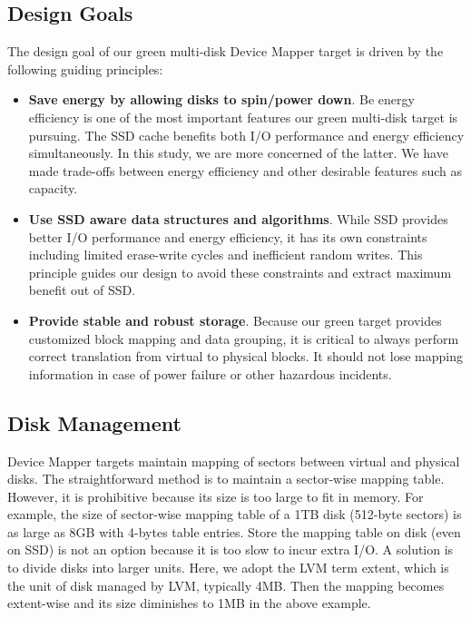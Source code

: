 \subsection{Design Goals}
The design goal of our green multi-disk Device Mapper target is driven
by the following guiding principles: 

\begin{itemize}

\item \textbf{Save energy by allowing disks to spin/power down}. Be
energy efficiency is one of the most important features our green
multi-disk target is pursuing. The SSD cache benefits both I/O
performance and energy efficiency simultaneously. In this study, we
are more concerned of the latter. We have made trade-offs between
energy efficiency and other desirable features such as capacity.

\item \textbf{Use SSD aware data structures and algorithms}. While SSD
provides better I/O performance and energy efficiency, it has its own
constraints including limited erase-write cycles and inefficient
random writes. This principle guides our design to avoid these
constraints and extract maximum benefit out of SSD.

\item \textbf{Provide stable and robust storage}. Because our green
target provides customized block mapping and data grouping, it is
critical to always perform correct translation from virtual to
physical blocks. It should not lose mapping information in case of
power failure or other hazardous incidents.

\end{itemize}

\subsection{Disk Management}

Device Mapper targets maintain mapping of sectors between virtual and
physical disks. The straightforward method is to maintain a
sector-wise mapping table. However, it is prohibitive because its size
is too large to fit in memory. For example, the size of sector-wise
mapping table of a 1TB disk (512-byte sectors) is as large as 8GB with
4-bytes table entries. Store the mapping table on disk (even on SSD)
is not an option because it is too slow to incur extra I/O. A solution
is to divide disks into larger units. Here, we adopt the LVM term
extent, which is the unit of disk managed by LVM, typically 4MB. Then
the mapping becomes extent-wise and its size diminishes to 1MB in the
above example. 

